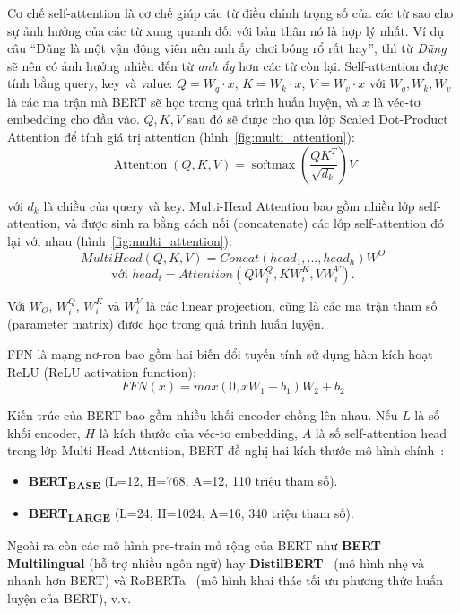 Cơ chế self-attention là cơ chế giúp các từ điều chỉnh trọng số của các từ sao
cho sự ảnh hưởng của các từ xung quanh đối với bản thân nó là hợp lý nhất. Ví
dụ câu ``Dũng là một vận động viên nên anh ấy chơi bóng rổ rất hay'', thì từ
\textit{Dũng} sẽ nên có ảnh hưởng nhiều đến từ \textit{anh ấy} hơn các từ còn
lại. Self-attention được tính bằng query, key và value: $Q = W_q \cdot x$, $K =
W_k \cdot x$, $V = W_v \cdot x$ với $W_q, W_k, W_v$ là các ma trận mà BERT sẽ
học trong quá trình huấn luyện, và $x$ là véc-tơ embedding cho đầu vào. $Q, K,
V$ sau đó sẽ được cho qua lớp Scaled Dot-Product Attention để tính giá trị
attention (hình~\ref{fig:multi_attention}):
\[ \operatorname{Attention}(Q, K, V)=\operatorname{softmax}\left(\frac{Q
K^{T}}{\sqrt{d_{k}}}\right) V \]

với $d_k$ là chiều của query và key. Multi-Head Attention bao gồm nhiều lớp
self-attention, và được sinh ra bằng cách nối (concatenate) các lớp
self-attention đó lại với nhau (hình~\ref{fig:multi_attention}):
\[ MultiHead(Q,K,V) = Concat(head_1,...,head_h)W^O \]
\[ \text{với } head_i = Attention(QW_i^Q, KW_i^K, VW_i^V). \]

Với $W_O$, $W_i^Q$, $W_i^K$ và $W_i^V$ là các linear projection, cũng là các ma
trận tham số (parameter matrix) được học trong quá trình huấn luyện.


FFN là mạng nơ-ron bao gồm hai biến đổi tuyến tính sử dụng hàm kích hoạt ReLU
(ReLU activation function):
\[ FFN(x) = max(0,xW_1 + b_1)W_2 + b_2 \]

Kiến trúc của BERT bao gồm nhiều khối encoder chồng lên nhau. Nếu $L$ là số
khối encoder, $H$ là kích thước của véc-tơ embedding, $A$ là số self-attention
head trong lớp Multi-Head Attention, BERT đề nghị hai kích thước mô hình
chính~\cite{devlinBERTPretrainingDeep2019}:
\begin{itemize}
	\item \textbf{BERT\textsubscript{BASE}} (L=12, H=768, A=12, 110 triệu tham
		số).
	\item \textbf{BERT\textsubscript{LARGE}} (L=24, H=1024, A=16, 340 triệu
		tham số).
\end{itemize}

Ngoài ra còn các mô hình pre-train mở rộng của BERT như \textbf{BERT
Multilingual} (hỗ trợ nhiều ngôn ngữ) hay
\textbf{DistilBERT}~\cite{sanhDistilBERTDistilledVersion2020} (mô hình nhẹ và
nhanh hơn BERT) và RoBERTa~\cite{liuRoBERTaRobustlyOptimized2019} (mô hình khai
thác tối ưu phương thức huấn luyện của BERT), v.v.

